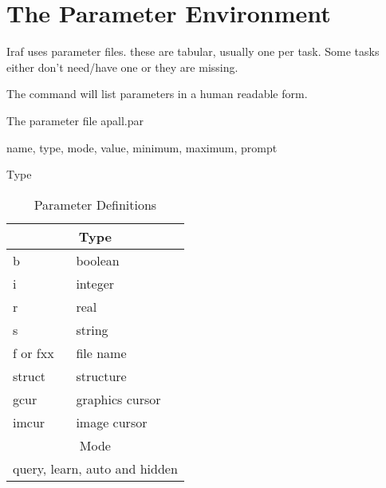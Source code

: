 \section{The Parameter Environment}

Iraf uses parameter files. these are tabular, usually one per task.
Some tasks either don't need/have one or they are missing.

The command   will list parameters in a 
human readable form. 

The parameter file apall.par

name, type, mode, value, minimum, maximum, prompt

Type

\begin{table}[h!]
\centering
\begin{tabular}{| l | l |}
\hline
\multicolumn{2}{c}{Type} \
Type  & Meaning   \\
\hline
b        & boolean     \\ 
i        & integer     \\ 
r        & real     \\ 
s        & string     \\ 
f or fxx & file name     \\ 
struct   & structure     \\ 
gcur     & graphics cursor     \\ 
imcur    & image cursor     \\ 
\multicolumn{2}{c}{Mode} \\
\multicolumn{2}{c}{query, learn, auto and hidden} \\
\hline
\end{tabular}
\caption[TOC]{ Parameter Definitions}
\label{table:ParameterDefinitions}
\end{table}


